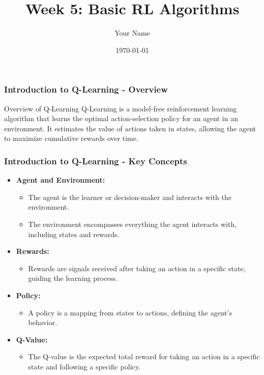\documentclass{beamer}
\title{Week 5: Basic RL Algorithms}
\author{Your Name}
\institute{Your Institution}
\date{\today}
\begin{document}
\frame{\titlepage}

\begin{frame}[fragile]
    \frametitle{Introduction to Q-Learning - Overview}
    \begin{block}{Overview of Q-Learning}
        Q-Learning is a model-free reinforcement learning algorithm that learns the optimal action-selection policy for an agent in an environment. It estimates the value of actions taken in states, allowing the agent to maximize cumulative rewards over time.
    \end{block}
\end{frame}

\begin{frame}[fragile]
    \frametitle{Introduction to Q-Learning - Key Concepts}
    \begin{itemize}
        \item \textbf{Agent and Environment:}
        \begin{itemize}
            \item The agent is the learner or decision-maker and interacts with the environment.
            \item The environment encompasses everything the agent interacts with, including states and rewards.
        \end{itemize}
        
        \item \textbf{Rewards:}
        \begin{itemize}
            \item Rewards are signals received after taking an action in a specific state, guiding the learning process.
        \end{itemize}

        \item \textbf{Policy:}
        \begin{itemize}
            \item A policy is a mapping from states to actions, defining the agent's behavior.
        \end{itemize}

        \item \textbf{Q-Value:}
        \begin{itemize}
            \item The Q-value is the expected total reward for taking an action in a specific state and following a specific policy.
        \end{itemize}
    \end{itemize}
\end{frame}
\end{document}
